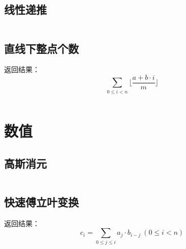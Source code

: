 \documentclass[landscape, twoside, a4paper]{article}
\newcommand{\cppcode}[1]{
	\inputminted[mathescape,
	frame=lines,linenos]{cpp}{source/#1}
}
\begin{document}
\begin{multicols}{2}
\begin{spacing}{0.8}
\cppcode{number-theory/primeroot.cpp}


\subsection{线性递推}

\cppcode{number-theory/linear-recurrence.cpp}











\subsection{直线下整点个数}


返回结果：$$\sum_{0 \leq i < n} \lfloor \frac{a + b \cdot i}{m} \rfloor$$
\cppcode{number-theory/lattice-count.cpp}


\section{数值}


\subsection{高斯消元}

\cppcode{numerical-algorithm/Gauss.cpp}


\subsection{快速傅立叶变换}


返回结果：$$c_i=\sum_{0 \leq j \leq i} a_j \cdot b_{i-j} \ (0 \leq i < n)$$


\end{spacing}
\end{multicols}
\end{document}
